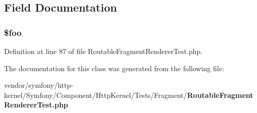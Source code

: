 \subsection{Field Documentation}
\subsubsection[{\$foo}]{\setlength{\rightskip}{0pt plus 5cm}\${\bf foo}}\label{class_symfony_1_1_component_1_1_http_kernel_1_1_tests_1_1_fragment_1_1_foo_a7a1efa8a0f6183fb3a5e8e8b0696526c}


Definition at line 87 of file Routable\+Fragment\+Renderer\+Test.\+php.



The documentation for this class was generated from the following file\+:\begin{DoxyCompactItemize}
\item 
vendor/symfony/http-\/kernel/\+Symfony/\+Component/\+Http\+Kernel/\+Tests/\+Fragment/{\bf Routable\+Fragment\+Renderer\+Test.\+php}\end{DoxyCompactItemize}
